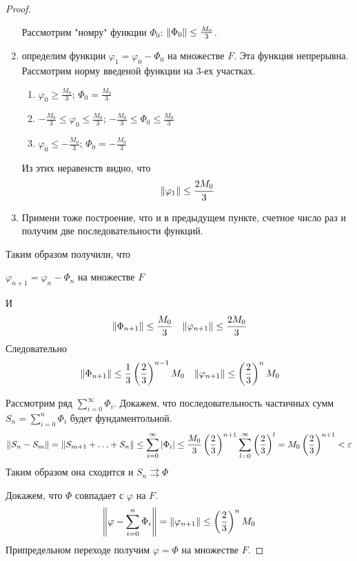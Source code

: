 \begin{proof}
\begin{enumerate}
        Рассмотрим "номру" функции $\Phi_0$: $\left\|\Phi_0\right\| \leq \frac{M_0}{3}$.
        \item определим функции $\varphi_1 = \varphi_0 - \Phi_0$ на множестве $F$. Эта функция непрерывна. Рассмотрим норму введеной функции на 3-ех участках.
        \begin{enumerate}
            \item $\varphi_0 \geq \frac{M_0}{3}$; $\Phi_0 = \frac{M_0}{3}$
            \item $ - \frac{M_0}{3} \leq \varphi_0 \leq \frac{M_0}{3}$; $-\frac{M_0}{3} \leq \Phi_0 \leq \frac{M_0}{3}$
            \item $\varphi_0 \leq -\frac{M_0}{3}$; $\Phi_0 = -\frac{M_0}{3}$
        \end{enumerate}
        Из этих неравенств видно, что
        \[
            \left\|\varphi_1\right\| \leq \frac{2 M_0}{3}
        \]
        \item Примени тоже построение, что и в предыдущем пункте, счетное число раз и получим две последовательности функций. 
    \end{enumerate}

    Таким образом получили, что
    \begin{center}
        $\varphi_{n + 1} = \varphi_n - \Phi_n$ на множестве $F$
    \end{center}
    И
    \begin{align}
        & \left\|\Phi_{n + 1}\right\| \leq \frac{M_0}{3}
        & \left\|\varphi_{n + 1}\right\| \leq \frac{2 M_0}{3}
    \end{align}
    Следовательно
    \begin{align}
        & \left\|\Phi_{n + 1}\right\| \leq \frac{1}{3} \left(\frac{2}{3}\right)^{n - 1} M_0
        & \left\|\varphi_{n + 1}\right\| \leq \left(\frac{2}{3}\right)^n M_0
    \end{align}

    Рассмотрим ряд $\sum_{i = 0}^{\infty}\Phi_i$. Докажем, что последовательность частичных сумм $S_n = \sum_{i = 0}^{n}\Phi_i$ будет фундаментольной.
    \[
        \left\|S_n - S_m\right\| = \left\|S_{m + 1} + \ldots + S_n\right\| \leq \sum_{i = 0}^{\infty}\left|\Phi_i\right| \leq \frac{M_0}{3} \left(\frac{2}{3}\right)^{n + 1} \sum_{l = 0}^{\infty} \left(\frac{2}{3}\right)^l = M_0 \left(\frac{2}{3}\right)^{n + 1} < \varepsilon
    \]
    Таким образом она сходится и $S_n \rightrightarrows \Phi$

    Докажем, что $\Phi$ совпадает с $\varphi$ на $F$.
    \[
        \left\|\varphi - \sum_{i = 0}^{n} \Phi_i\right\| = \left\|\varphi_{n + 1}\right\| \leq \left(\frac{2}{3}\right)^n M_0
    \]
    Припредельном переходе получим $\varphi = \Phi$ на множестве $F$.
\end{proof}
